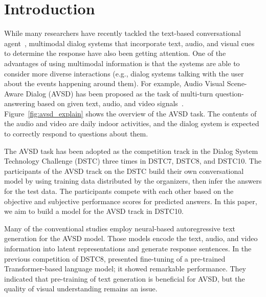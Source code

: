 \documentclass[letterpaper]{article} %
\begin{document}
\section{Introduction}
While many researchers have recently tackled the text-based conversational agent~\cite{Heck2020trippy,Xu2021beyond}, multimodal dialog systems that incorporate text, audio, and visual cues to determine the response have also been getting attention.
% 
One of the advantages of using multimodal information is that the systems are able to consider more diverse interactions (e.g., dialog systems talking with the user about the events happening around them).
For example, Audio Visual Scene-Aware Dialog (AVSD) has been proposed as the task of multi-turn question-answering based on given text, audio, and video signals~\cite{Nguyen2018from,Hori2019joint,Li2021bridging}.
Figure~\ref{fig:avsd_explain} shows the overview of the AVSD task.
The contents of the audio and video are daily indoor activities, and the dialog system is expected to correctly respond to questions about them.

The AVSD task has been adopted as the competition track in the Dialog System Technology Challenge (DSTC) three times in DSTC7, DSTC8, and DSTC10.
The participants of the AVSD track on the DSTC build their own conversational model by using training data distributed by the organizers, then infer the answers for the test data.
% 
The participants compete with each other based on the objective and subjective performance scores for predicted answers. 
In this paper, we aim to build a model for the AVSD track in DSTC10.

Many of the conventional studies employ neural-based autoregressive text generation for the AVSD model.
Those models encode the text, audio, and video information into latent representations and generate response sentences.
In the previous competition of DSTC8, \citet{Li2021bridging} presented fine-tuning of a pre-trained Transformer-based language model; it showed remarkable performance.
They indicated that pre-training of text generation is beneficial for AVSD, but the quality of visual understanding remains an issue.
\end{document}
